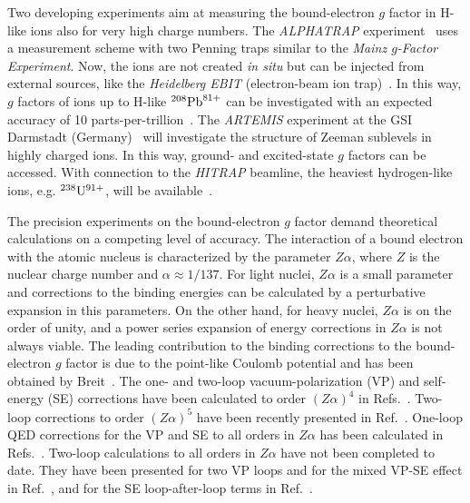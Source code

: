 Two developing experiments aim at measuring the bound-electron $g$ factor in H-like ions also for very high charge numbers. The \textit{ALPHATRAP} experiment~\cite{sturm2017} uses a measurement scheme with two Penning traps similar to the \textit{Mainz $g$-Factor Experiment}. Now, the ions are not created \textit{in situ} but can be injected from external sources, like the \textit{Heidelberg EBIT} (electron-beam ion trap)~\cite{ebit1999}. In this way, $g$ factors of ions up to H-like $^{208}\rm{Pb}^{81+}$ can be investigated with an expected accuracy of 10 parts-per-trillion~\cite{sturm2017}. The \textit{ARTEMIS} experiment at the GSI Darmstadt (Germany)~\cite{vogel2013,sturm2017} will investigate the structure of Zeeman sublevels in highly charged ions. In this way, ground- and excited-state $g$ factors can be accessed. With connection to the \textit{HITRAP} beamline, the heaviest hydrogen-like ions, e.g. $^{238}\rm{U}^{91+}$, will be available~\cite{vogel2015}.

The precision experiments on the bound-electron $g$ factor demand theoretical calculations on a competing level of accuracy. The interaction of a bound electron with the atomic nucleus is characterized by the parameter $Z\alpha$, where $Z$ is the nuclear charge number and $\alpha \approx 1/137$. For light nuclei, $Z\alpha$ is a small parameter and corrections to the binding energies can be calculated by a perturbative expansion in this parameters. On the other hand, for heavy nuclei, $Z\alpha$ is on the order of unity, and a power series expansion of energy corrections in $Z\alpha$ is not always viable. %
The leading contribution to the binding corrections to the bound-electron $g$ factor is due to the point-like Coulomb potential and has been obtained by Breit~\cite{breit1928}.
The one- and two-loop vacuum-polarization (VP) and self-energy (SE) corrections have been calculated to order $(Z\alpha)^4$ in Refs.~\cite{karshenboim2000,Pachucki2004,pachucki2004_err,Pachucki2005,czarnecki2016}. 
Two-loop corrections to order $(Z\alpha)^5$ have been recently presented in Ref.~\cite{czarnecki2018}.
One-loop QED corrections for the VP and SE to all orders in $Z\alpha$ has been calculated in Refs.~\cite{Beier2000,Karshenboim2001,yerokhin2002,Yerokhin2004,Lee2005,Lee2007,yerokhin2008,yerokhin2010,yerokhin2017}.
Two-loop calculations to all orders in $Z\alpha$ have not been completed to date. They have been presented for two VP loops and for the mixed VP-SE effect in Ref.~\cite{yerokhin2013}, and for the SE loop-after-loop terms in Ref.~\cite{sikora2018_arxiv}.

